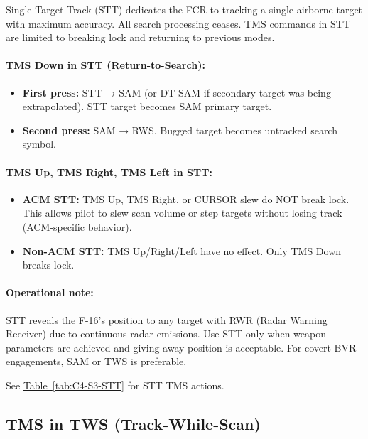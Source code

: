 \documentclass[11pt, a4paper, twoside]{report}
\newcommand{\tabref}[1]{\hyperref[#1]{Table~\ref*{#1}}}
\begin{document}
Single Target Track (STT) dedicates the FCR to tracking a single airborne target with maximum accuracy. All search processing ceases. TMS commands in STT are limited to breaking lock and returning to previous modes.

\paragraph{TMS Down in STT (Return-to-Search):}
\begin{itemize}
    \item \textbf{First press:} STT → SAM (or DT SAM if secondary target was being extrapolated). STT target becomes SAM primary target.
    \item \textbf{Second press:} SAM → RWS. Bugged target becomes untracked search symbol.
\end{itemize}

\paragraph{TMS Up, TMS Right, TMS Left in STT:}
\begin{itemize}
    \item \textbf{ACM STT:} TMS Up, TMS Right, or CURSOR slew do NOT break lock. This allows pilot to slew scan volume or step targets without losing track (ACM-specific behavior).
    \item \textbf{Non-ACM STT:} TMS Up/Right/Left have no effect. Only TMS Down breaks lock.
\end{itemize}

\paragraph{Operational note:}
STT reveals the F-16's position to any target with RWR (Radar Warning Receiver) due to continuous radar emissions. Use STT only when weapon parameters are achieved and giving away position is acceptable. For covert BVR engagements, SAM or TWS is preferable.

See \tabref{tab:C4-S3-STT} for STT TMS actions.

\subsection{TMS in TWS (Track-While-Scan)}
\label{sec:C4-S3-S3}
\end{document}
